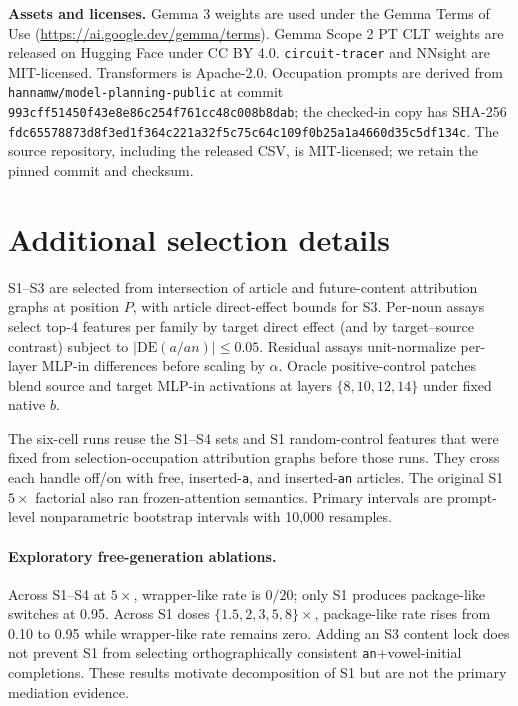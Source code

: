 \noindent\textbf{Assets and licenses.}
Gemma 3 weights are used under the Gemma Terms of Use
(\url{https://ai.google.dev/gemma/terms}). Gemma Scope 2 PT CLT weights are
released on Hugging Face under CC BY 4.0. \texttt{circuit-tracer} and
NNsight are MIT-licensed. Transformers is Apache-2.0. Occupation prompts
are derived from \texttt{hannamw/model-planning-public}
\citep{hanna2026planningdata} at commit
\texttt{993cff51450f43e8e86c254f761cc48c008b8dab}; the checked-in copy has
SHA-256 \texttt{fdc65578873d8f3ed1f364c221a32f5c75c64c109f0b25a1a4660d35c5df134c}.
The source repository, including the released CSV, is MIT-licensed; we
retain the pinned commit and checksum.

\section{Additional selection details}
\label{app:selection}

S1--S3 are selected from intersection of article and future-content
attribution graphs at position \(P\), with article direct-effect bounds for
S3. Per-noun assays select top-4 features per family by target direct
effect (and by target--source contrast) subject to
\(|\mathrm{DE}(a/an)|\le 0.05\). Residual assays unit-normalize
per-layer MLP-in differences before scaling by \(\alpha\). Oracle
positive-control patches blend source and target MLP-in activations at
layers \(\{8,10,12,14\}\) under fixed native \(b\).

The six-cell runs reuse the S1--S4 sets and S1 random-control features
that were fixed from selection-occupation attribution graphs before those
runs. They cross each handle off/on with free, inserted-\texttt{a}, and
inserted-\texttt{an} articles. The original S1 \(5\times\) factorial also
ran frozen-attention semantics. Primary intervals are prompt-level
nonparametric bootstrap intervals with 10,000 resamples.

\paragraph{Exploratory free-generation ablations.}
Across S1--S4 at \(5\times\), wrapper-like rate is \(0/20\); only S1
produces package-like switches at 0.95. Across S1 doses
\(\{1.5,2,3,5,8\}\times\), package-like rate rises from 0.10 to 0.95 while
wrapper-like rate remains zero. Adding an S3 content lock does not prevent
S1 from selecting orthographically consistent \texttt{an}+vowel-initial completions. These
results motivate decomposition of S1 but are not the primary mediation
evidence.

